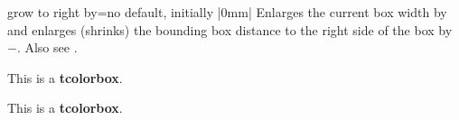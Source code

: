 \begin{docTcbKey}{grow to right by}{=}{no default, initially |0mm|}
  Enlarges the current box width by  and
  enlarges (shrinks) the bounding box distance to the right side of the box by
  $-$. Also see .
\begin{dispExample}

\begin{tcolorbox}[grow to right by=2cm,enhanced,show bounding box]
This is a \textbf{tcolorbox}.
\end{tcolorbox}

\bigskip

\begin{tcolorbox}[grow to right by=2cm,grow to left by=1cm,
  enhanced,show bounding box]
This is a \textbf{tcolorbox}.
\end{tcolorbox}

\end{dispExample}
\end{docTcbKey}


